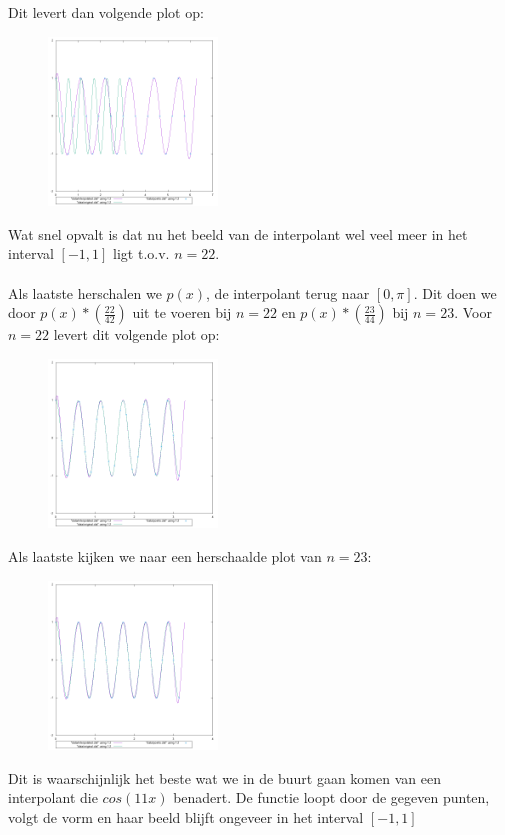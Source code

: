 \documentclass[10pt,a4paper,twocolumn]{article}
\begin{document}
Dit levert dan volgende plot op:
\begin{figure}[H]
\includegraphics[width=0.4\textwidth]{combined-23-transformed}
\end{figure}
Wat snel opvalt is dat nu het beeld van de interpolant wel veel meer in het interval $[-1, 1]$ ligt t.o.v. $n = 22$.
\\
\\
Als laatste herschalen we $p(x)$, de interpolant terug naar $[0, \pi]$. Dit doen we door $p(x)*(\frac{22}{42})$ uit te voeren bij $n = 22$ en $p(x)*(\frac{23}{44})$ bij $n = 23$. Voor $n  = 22$ levert dit volgende plot op:
\begin{figure}[H]
\includegraphics[width=0.4\textwidth]{combined-22-transformed-scaled}
\end{figure}
Als laatste kijken we naar een herschaalde plot van $n = 23$:
\begin{figure}[H]
\includegraphics[width=0.4\textwidth]{combined-23-transformed-scaled}
\end{figure}
Dit is waarschijnlijk het beste wat we in de buurt gaan komen van een interpolant die $cos(11x)$ benadert. De functie loopt door de gegeven punten, volgt de vorm en haar beeld blijft ongeveer in het interval $[-1, 1]$
\end{document}
